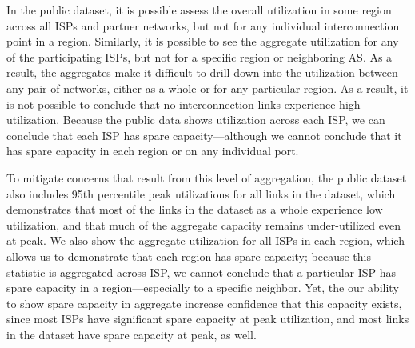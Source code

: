 In the public dataset, it is possible assess the overall utilization in
some region across all ISPs and partner networks, but not for any
individual interconnection point in a region.  Similarly, it is possible
to see the aggregate utilization for any of the participating ISPs, but
not for a specific region or neighboring AS.  As a result, the aggregates
make it difficult to drill down into the utilization between any pair of
networks, either as a whole or for any particular region.  As a result,
it is not possible to conclude that no interconnection links experience
high utilization. Because the public data shows utilization across each
ISP, we can conclude that each ISP has spare capacity---although we
cannot conclude that it has spare capacity in each region or on any
individual port.  

To mitigate concerns that result from this level of aggregation, the
public dataset also includes 95th percentile peak utilizations for all
links in the dataset, which demonstrates that most of the links in the
dataset as a whole experience low utilization, and that much of the
aggregate capacity remains under-utilized even at peak. We also show the
aggregate utilization for all ISPs in each region, which allows us to
demonstrate that each region has spare capacity; because this statistic
is aggregated across ISP, we cannot conclude that a particular ISP has
spare capacity in a region---especially to a specific neighbor.  Yet,
the our ability to show spare capacity in aggregate increase confidence
that this capacity exists, since most ISPs have significant spare
capacity at peak utilization, and most links in the dataset have spare
capacity at peak, as well.


